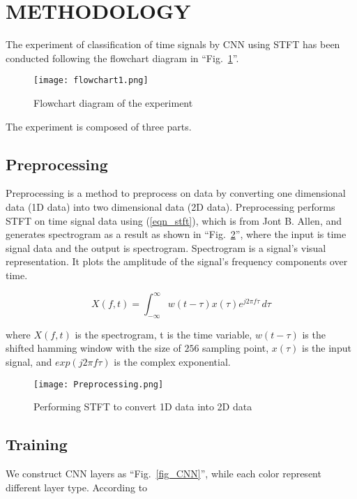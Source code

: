 \documentclass[conference]{IEEEtran}
\begin{document}
\section{METHODOLOGY}

The experiment of classification of time signals by CNN using STFT has been conducted following the flowchart diagram in ``Fig.~\ref{fig_flowchart}''.

\begin{figure}[htbp]
\centerline{\texttt{[image: flowchart1.png]}}
\caption{Flowchart diagram of the experiment}
\label{fig_flowchart}
\end{figure}

The experiment is composed of three parts.

\subsection{Preprocessing}
Preprocessing is a method to preprocess on data by converting one dimensional data (1D data) into two dimensional data (2D data). Preprocessing performs STFT on time signal data using (\ref{eqn_stft}), which is from Jont B. Allen\cite{b3}, and generates spectrogram as a result as shown in ``Fig.~\ref{fig_preprocessing}'', where the input is time signal data and the output is spectrogram. Spectrogram is a signal's visual representation. It plots the amplitude of the signal's frequency components over time. 

\begin{equation}
X(f,t) = \int_{-\infty}^{\infty} w(t-\tau)x(\tau)e^{j2\pi f\tau} \,d\tau \label{eqn_stft}
\end{equation}

where \(X(f, t) \) is the spectrogram, t is the time variable, \(w(t - \tau)\) is the shifted hamming window with the size of \(256\) sampling point, \(x(\tau)\) is the input
signal, and \(exp (j2\pi f\tau)\) is the complex exponential.

\begin{figure}[htbp]
\centerline{\texttt{[image: Preprocessing.png]}}
\caption{Performing STFT to convert 1D data into 2D data}
\label{fig_preprocessing}
\end{figure}


\subsection{Training}

We construct CNN layers as ``Fig.~\ref{fig_CNN}'', while each color represent different layer type. According to 
\end{document}
